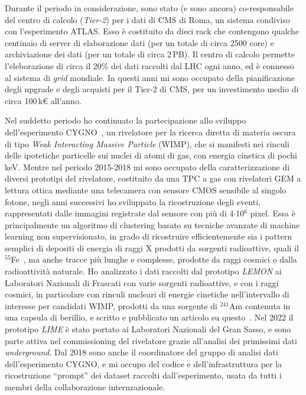 \documentclass[a4paper,12pt,twoside]{article}
\begin{document}
{  Durante il periodo in considerazione, sono stato (e sono ancora)
  co-responsabile del centro di calcolo (\textit{Tier-2}) per i dati
  di CMS di Roma, un sistema condiviso con l'esperimento ATLAS. Esso
  \`e costituito da dieci rack che contengono qualche centinaio di
  server di elaborazione dati (per un totale di circa 2500 core) e
  archiviazione dei dati (per un totale di circa 2\,PB). Il centro di
  calcolo permette l'eleborazione di circa il 20\% dei dati raccolti
  dal LHC ogni anno, ed \`e connesso al sistema di \textit{grid}
  mondiale. In questi anni mi sono occupato della pianificazione degli
  upgrade e degli acquisti per il Tier-2 di CMS, per un investimento
  medio di circa 100\,k\euro{} all'anno.

  Nel suddetto periodo ho continuato la partecipazione allo sviluppo
  dell'esperimento CYGNO~\cite{Pinci:2019ztr}, un rivelatore per la
  ricerca diretta di materia oscura di tipo \textit{Weak Interacting
    Massive Particle} (WIMP), che si manifesti nei rinculi delle
  ipotetiche particelle sui nuclei di atomi di gas, con energia
  cinetica di pochi keV. Mentre nel periodo 2015-2018 mi sono occupato
  della caratterizzazione di diversi prototipi del rivelatore,
  costituito da una TPC a gas con rivelatori GEM a lettura ottica
  mediante una telecamera con sensore CMOS sensibile al singolo
  fotone, negli anni successivi ho sviluppato la ricostruzione degli
  eventi, rappresentati dalle immagini registrate dal sensore con
  pi\`u di 4$\cdot$10$^6$ pixel.  Essa \`e principalmente un algoritmo
  di clustering basato su tecniche avanzate di machine learning non
  supervisionato, in grado di ricostruire efficientemente sia i
  pattern semplici di depositi di energia di raggi X prodotti da
  sorgenti radioattive, quali il $^{55}$Fe~\cite{Costa_2019}, ma anche
  tracce pi\`u lunghe e complesse, prodotte da raggi cosmici o dalla
  radioattivit\`a naturale. Ho analizzato i dati raccolti dal
  prototipo {\it LEMON} ai Laboratori Nazionali di Frascati con varie
  sorgenti radioattive, e con i raggi cosmici, in particolare con
  rinculi nucleari di energie cinetiche nell'intervallo di interesse
  per candidati WIMP, prodotti da una sorgente di $^{241}$Am contenuta
  in una capsula di berillio, e scritto e pubblicato un articolo su
  questo~\cite{Baracchini:2020nut}.  Nel 2022 il prototipo {\it LIME}
  \`e stato portato ai Laboratori Nazionali del Gran Sasso, e sono
  parte attiva nel commissioning del rivelatore grazie all'analisi dei
  primissimi dati {\it underground}.  Dal 2018 sono anche il
  coordinatore del gruppo di analisi dati dell'esperimento CYGNO, e mi
  occupo del codice e dell'infrastruttura per la ricostruzione
  ``prompt'' dei dataset raccolti dall'esperimento, usata da tutti i
  membri della collaborazione internzazionale.

}
\end{document}
